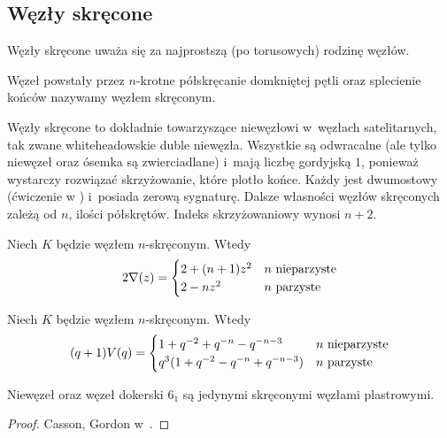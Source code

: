 
\subsection{Węzły skręcone}
%

Węzły skręcone uważa się za najprostszą (po torusowych) rodzinę węzłów.

\begin{definition}
    Węzeł powstały przez $n$-krotne półskręcanie domkniętej pętli oraz splecienie końców nazywamy węzłem skręconym.
\end{definition}

Węzły skręcone to dokładnie towarzyszące niewęzłowi w~węzłach satelitarnych, tak zwane whiteheadowskie duble niewęzła.
Wszystkie są odwracalne (ale tylko niewęzeł oraz ósemka są zwierciadlane) i~mają liczbę gordyjską $1$, ponieważ wystarczy rozwiązać skrzyżowanie, które plotło końce.
%
Każdy jest dwumostowy (ćwiczenie w \cite[s. 114]{rolfsen76}) i~posiada zerową sygnaturę.
%
%
Dalsze własności węzłów skręconych zależą od $n$, ilości półskrętów.
Indeks skrzyżowaniowy wynosi $n + 2$.

\begin{proposition}
%
    Niech $K$ będzie węzłem $n$-skręconym.
    Wtedy
    \begin{equation}
    2 \nabla (z) = \begin{cases}
        2 + (n+1) z^{2} & n \mbox{ nieparzyste} \\
        2 - nz^2 & n \mbox{ parzyste}
    \end{cases}
    \end{equation}
\end{proposition}

\begin{proposition}
%
    Niech $K$ będzie węzłem $n$-skręconym.
    Wtedy
    \begin{equation}
    (q+1)V(q) = \begin{cases}
        1+q^{-2}+q^{-n}-q^{-n-3} & n \mbox{ nieparzyste} \\
        q^3(1+q^{-2}-q^{-n}+q^{-n-3}) & n \mbox{ parzyste}
    \end{cases}
    \end{equation}
\end{proposition}

\begin{proposition}
%
    Niewęzeł oraz węzeł dokerski $6_1$ są jedynymi skręconymi węzłami plastrowymi.
\end{proposition}

\begin{proof}
    Casson, Gordon w~\cite{casson86}.
\end{proof}

%



